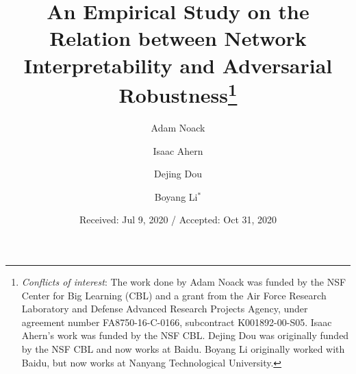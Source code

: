%
%


\title{An Empirical Study on the Relation between Network Interpretability and Adversarial Robustness\thanks{\textit{Conflicts of interest}: The work done by Adam Noack was funded by the NSF Center for Big Learning (CBL) and a grant from the Air Force Research Laboratory and Defense Advanced Research Projects Agency, under agreement number FA8750-16-C-0166, subcontract K001892-00-S05. Isaac Ahern's work was funded by the NSF CBL. Dejing Dou was originally funded by the NSF CBL and now works at Baidu. Boyang Li originally worked with Baidu, but now works at Nanyang Technological University.
}} 


\author{Adam Noack \and Isaac Ahern \and Dejing Dou \and Boyang Li$^*$
}



\date{Received: Jul 9, 2020 / Accepted: Oct 31, 2020}


\maketitle

